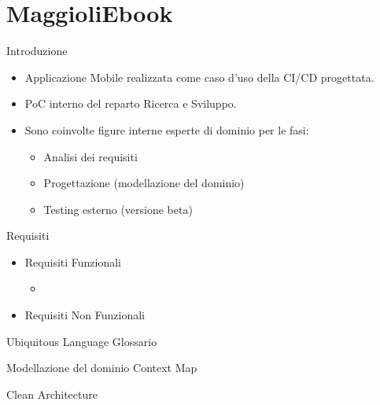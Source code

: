
\section{MaggioliEbook}
    \begin{frame}{Introduzione}
        \begin{itemize}
            \item Applicazione Mobile realizzata come caso d'uso della CI/CD progettata.
            \item PoC interno del reparto Ricerca e Sviluppo.
            \item Sono coinvolte figure interne esperte di dominio per le fasi:
            \begin{itemize}
                \item Analisi dei requisiti
                \item Progettazione (modellazione del dominio)
                \item Testing esterno (versione beta)
            \end{itemize}
        \end{itemize}
    \end{frame}
    
    \begin{frame}{Requisiti}
        \begin{itemize}
            \item Requisiti Funzionali
            \begin{itemize}
                \item 
            \end{itemize}
            \item Requisiti Non Funzionali
        \end{itemize}
    \end{frame}

    \begin{frame}{Ubiquitous Language}
        Glossario
    \end{frame}

    \begin{frame}{Modellazione del dominio}
        Context Map
    \end{frame}

    \begin{frame}{Clean Architecture}
        
    \end{frame}